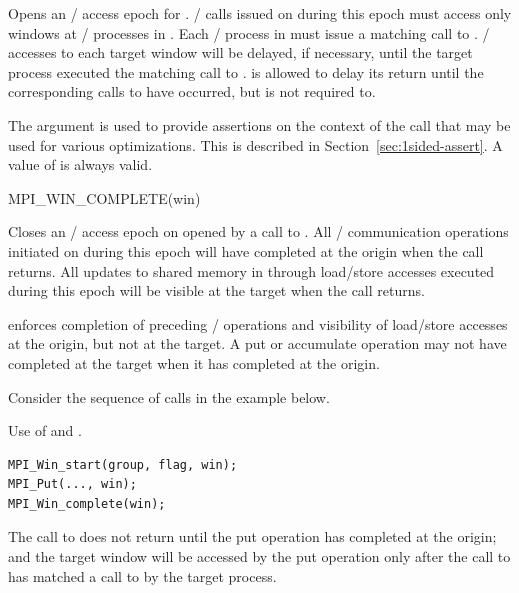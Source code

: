 Opens an \RMA/ access epoch for .  \RMA/ calls issued on
 during this epoch must access only windows at
\mpi/ processes in .
Each \mpi/ process in  must issue a matching call to 
.
\RMA/ accesses to each target
window will be delayed, if necessary,
until the target process executed the matching call to 
.
 is allowed to delay its return until the corresponding calls to
 have occurred, but is not required to.

The  argument is used to provide assertions on the
context of the call that may be used for various optimizations.  This
is described in
Section~\ref{sec:1sided-assert}.  A value of  is
always valid.

%
\begin{funcdef}{MPI\_WIN\_COMPLETE}{(\mbox{win})}
\end{funcdef}

Closes an \RMA/ access epoch on  opened by a
call to .  All \RMA/ communication
operations initiated on  during this epoch will have completed at
the origin when the call returns.
All updates to shared memory in  through load/store accesses executed during this epoch will be visible
at the target when the call returns.

 enforces completion of preceding \RMA/
operations and visibility of load/store accesses at the origin, but not at the target.
A put or accumulate operation may not have completed
at the target when it has completed at the origin.

Consider the sequence of calls in the example below.
\begin{example}
\label{ex:1sided-start-complete}
%
Use of  and .
\begin{lstlisting}[language={[MPI]C}]
MPI_Win_start(group, flag, win);
MPI_Put(..., win);
MPI_Win_complete(win);
\end{lstlisting}

The call to  does not return until the
put operation has completed at the origin; and
the target window will be accessed by the put operation only after the
call to  has matched a call to
 by the target process.
\end{example}

